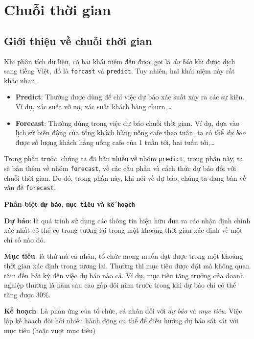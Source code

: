 \documentclass[]{krantz}
\providecommand{\tightlist}{%
  \setlength{\itemsep}{0pt}\setlength{\parskip}{0pt}}
\theoremstyle{definition}
\theoremstyle{definition}
\theoremstyle{definition}
\theoremstyle{remark}
\begin{document}
\mainmatter

\hypertarget{part-chui-thi-gian}{%
\part{Chuỗi thời gian}\label{part-chui-thi-gian}}

\hypertarget{gii-thiu-v-chui-thi-gian}{%
\chapter{Giới thiệu về chuỗi thời gian}\label{gii-thiu-v-chui-thi-gian}}

Khi phân tích dữ liệu, có hai khái niệm đều được gọi là \emph{dự báo}
khi được dịch sang tiếng Việt, đó là \texttt{forcast} và
\texttt{predict}. Tuy nhiên, hai khái niệm này rất khác nhau.

\begin{itemize}
\tightlist
\item
  \textbf{Predict}: Thường được dùng để chỉ việc dự báo xác suất xảy ra
  các sự kiện. Ví dụ, xác suất vỡ nợ, xác suất khách hàng churn,\ldots{}
\item
  \textbf{Forecast}: Thường dùng trong việc dự báo chuỗi thời gian. Ví
  dụ, dựa vào lịch sử biến động của tổng khách hàng uống cafe theo tuần,
  ta có thể \emph{dự báo} được số lượng khách hàng uống cafe của 1 tuần
  tới, hai tuần tới,\ldots{}
\end{itemize}

Trong phần trước, chúng ta đã bàn nhiều về nhóm \texttt{predict}, trong
phần này, ta sẽ bàn thêm về nhóm \texttt{forecast}, về các cấu phần và
cách thức dự báo đối với chuỗi thời gian. Do đó, trong phần này, khi nói
về dự báo, chúng ta đang bàn về vấn đề \texttt{forecast}.

\textbf{Phân biệt \texttt{dự\ báo}, \texttt{mục\ tiêu} và
\texttt{kế\ hoạch}}

\textbf{Dự báo}: là quá trình sử dụng các thông tin hiện hữu đưa ra các
nhận định chính xác nhất có thể có trong tương lai trong một khoảng thời
gian xác định về một chỉ số nào đó.

\textbf{Mục tiêu}: là thứ mà cá nhân, tổ chức mong muốn đạt được trong
một khoảng thời gian xác định trong tương lai. Thường thì mục tiêu được
đặt mà không quan tâm đến bất kỳ đến việc dự báo nào cả. Ví dụ, mục tiêu
tăng trưởng của doanh nghiệp thường là năm sau cao gấp đôi năm trước
trong khi dự báo chỉ có thể tăng được 30\%.

\textbf{Kế hoạch}: Là phản ứng của tổ chức, cá nhân đối với \emph{dự
báo} và \emph{mục tiêu}. Việc lập kế hoạch đòi hỏi nhiều hành động cụ
thể để điều hướng dự báo sát sát với mục tiêu (hoặc vượt mục tiêu)
\end{document}
